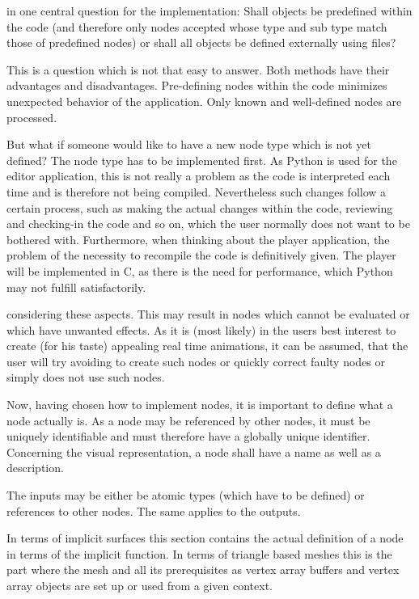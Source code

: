 \documentclass[%
    a4paper,    %
    justified,  %
    nobib,      %
    openany     %
]{tufte-book}
\begin{document}
 in one central question for the
implementation: Shall objects be predefined within the code (and therefore only
nodes accepted whose type and sub type match those of predefined nodes) or shall
all objects be defined externally using files?

This is a question which is not that easy to answer. Both methods have their
advantages and disadvantages. Pre-defining nodes within the code minimizes
unexpected behavior of the application. Only known and well-defined nodes are
processed.

But what if someone would like to have a new node type which is not yet defined?
The node type has to be implemented first. As Python is used for the editor
application, this is not really a problem as the code is interpreted each time
and is therefore not being compiled. Nevertheless such changes follow a certain
process, such as making the actual changes within the code, reviewing and
checking-in the code and so on, which the user normally does not want to be
bothered with. Furthermore, when thinking about the player application, the
problem of the necessity to recompile the code is definitively given. The player
will be implemented in C, as there is the need for performance, which Python may
not fulfill satisfactorily.

 considering these
aspects. This may result in nodes which cannot be evaluated or which have
unwanted effects. As it is (most likely) in the users best interest to create
(for his taste) appealing real time animations, it can be assumed, that the user
will try avoiding to create such nodes or quickly correct faulty nodes or simply
does not use such nodes.

Now, having chosen how to implement nodes, it is important to define what a node
actually is. As a node may be referenced by other nodes, it must be uniquely
identifiable and must therefore have a globally unique identifier. Concerning
the visual representation, a node shall have a name as well as a description.

 The
inputs may be either be atomic types (which have to be defined) or references to
other nodes. The same applies to the outputs.

 In terms of implicit surfaces
this section contains the actual definition of a node in terms of the implicit
function. In terms of triangle based meshes this is the part where the mesh and
all its prerequisites as vertex array buffers and vertex array objects are set
up or used from a given context.
\end{document}
